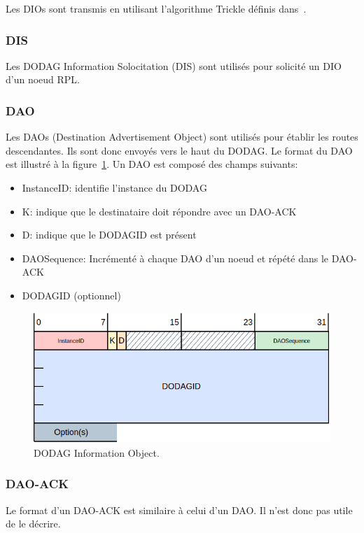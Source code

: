     Les DIOs sont transmis en utilisant l'algorithme Trickle définis dans~\cite{trickle:rfc}.

\subsubsection*{DIS}
    Les DODAG Information Solocitation (DIS) sont utilisés pour solicité un DIO d'un noeud RPL.

\subsubsection*{DAO}%
    Les DAOs (Destination Advertisement Object) sont utilisés pour établir les routes descendantes.
    Ils sont donc envoyés vers le haut du DODAG. Le format du DAO est illustré à la figure~\ref{fig:state-dao}. Un DAO est composé des champs suivants:
    \begin{itemize}
        \item InstanceID: identifie l'instance du DODAG
        \item K: indique que le destinataire doit répondre avec un DAO-ACK
        \item D: indique que le DODAGID est présent
        \item DAOSequence: Incrémenté à chaque DAO d'un noeud et répété dans le DAO-ACK
        \item DODAGID (optionnel)
    \end{itemize}
    \begin{figure}[H]
        \centering
        \includegraphics[scale=0.5]{res/dao.drawio.png}
        \caption{DODAG Information Object.}
        \label{fig:state-dao}
    \end{figure}

\subsubsection*{DAO-ACK}
    Le format d'un DAO-ACK est similaire à celui d'un DAO. Il n'est donc pas utile de le décrire.

